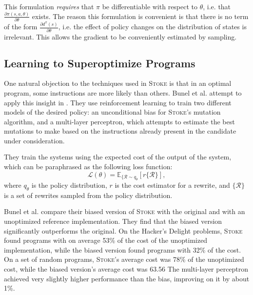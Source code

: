\documentclass[12pt,twoside]{reedthesis}
\begin{document}
        This formulation \textit{requires} that $\pi$ be differentiable with respect to $\theta$, i.e. that $\frac{\partial \pi(s,a, \theta)}{\partial \theta}$ exists.
        The reason this formulation is convenient is that there is no term of the form $\frac{\partial d^\pi(s)}{\partial \theta}$, i.e. the effect of policy changes on the distribution of states is irrelevant.
        This allows the gradient to be conveniently estimated by sampling.


        \subsection{Learning to Superoptimize Programs}
            One natural objection to the techniques used in \textsc{Stoke} is that in an optimal program, some instructions are more likely than others.
            Bunel et al. attempt to apply this insight in \cite{bunel2017learning}.
            They use reinforcement learning to train two different models of the desired policy:
                an unconditional bias for \textsc{Stoke}'s mutation algorithm,
                and a multi-layer perceptron\footnotemark,
                    which attempts to estimate the best mutations to make based on the instructions already present in the candidate under consideration.
            
            They train the systems using the expected cost of the output of the system, which can be paraphrased as the following loss function:
            \[
                \mathcal{L}(\theta) = \mathbb{E}_{\{\mathcal{R}\sim q_\theta}[r\{\mathcal{R}\}],
            \]
            where $q_\theta$ is the policy distribution, $r$ is the cost estimator for a rewrite, and $\{\mathcal{R}\}$ is a set of rewrites sampled from the policy distribution.
            
            Bunel et al. compare their biased version of \textsc{Stoke} with the original and with an unoptimized reference implementation.
            They find that the biased version significantly outperforms the original.
            On the Hacker's Delight problems, \textsc{Stoke} found programs with on average 53\% of the cost of the unoptimized implementation, while the biased version found programs with 32\% of the cost.
            On a set of random programs, \textsc{Stoke}'s average cost was 78\% of the unoptimized cost, while the biased version's average cost was 63.56%
            The multi-layer perceptron achieved very slightly higher performance than the bias, improving on it by about 1\%.
\end{document}
